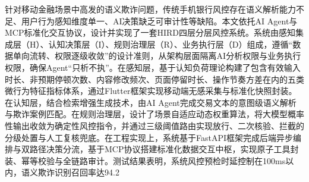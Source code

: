 针对移动金融场景中高发的语义欺诈问题，传统手机银行风控存在语义解析能力不足、用户行为感知维度单一、AI决策缺乏可审计性等缺陷。本文依托AI Agent与MCP标准化交互协议，设计并实现了一套HIRD四层分层风控系统。系统由感知集成层（H）、认知决策层（I）、规则治理层（R）、业务执行层（D）组成，遵循“数据单向流转、权限逐级收敛”的设计准则，从架构层面隔离AI分析权限与业务执行权限，确保Agent“只析不执”。在感知层，基于认知负荷理论构建了包含有效输入时长、非预期停顿次数、内容修改频次、页面停留时长、操作节奏方差在内的五类微行为特征指标体系，通过Flutter框架实现移动端无感采集与标准化快照封装。在认知层，结合检索增强生成技术，由AI Agent完成交易文本的意图级语义解析与欺诈案例匹配。在规则治理层，设计了场景自适应动态权重算法，将大模型概率性输出收敛为确定性风控指令，并通过三级阈值路由实现放行、二次核验、拦截的分级处置与人工复核兜底。在工程实现上，系统基于FastAPI框架完成后端异步编排与双路径决策分流，基于MCP协议搭建标准化数据交互中枢，实现原子工具封装、幂等校验与全链路审计。测试结果表明，系统风控预检时延控制在100ms以内，语义欺诈识别召回率达94.2%